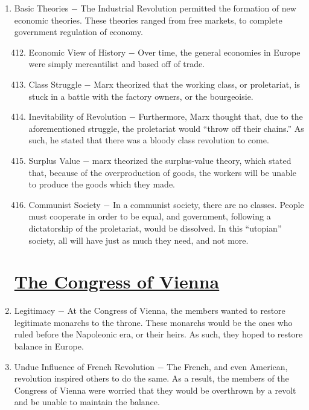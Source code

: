 \documentclass[12pt]{article}
\begin{document}
\begin{enumerate}
\item Basic Theories $-$ The Industrial Revolution permitted the formation of new economic theories. These theories ranged from free markets, to complete government regulation of economy.

\begin{enumerate}[label=\arabic{*}.]
\setcounter{enumii}{411}

\item Economic View of History $-$ Over time, the general economies in Europe were simply mercantilist and based off of trade. 

\item Class Struggle $-$ Marx theorized that the working class, or proletariat, is stuck in a battle with the factory owners, or the bourgeoisie. 

\item Inevitability of Revolution $-$ Furthermore, Marx thought that, due to the aforementioned struggle, the proletariat would ``throw off their chains.'' As such, he stated that there was a bloody class revolution to come.

\item Surplus Value $-$ marx theorized the surplus-value theory, which stated that, because of the overproduction of goods, the workers will be unable to produce the goods which they made.

\item Communist Society $-$ In a communist society, there are no classes. People must cooperate in order to be equal, and government, following a dictatorship of the proletariat, would be dissolved. In this ``utopian'' society, all will have just as much they need, and not more.

\end{enumerate}
\setcounter{enumi}{416}

\section{\underline{The Congress of Vienna}}

\item Legitimacy $-$ At the Congress of Vienna, the members wanted to restore legitimate monarchs to the throne. These monarchs would be the ones who ruled before the Napoleonic era, or their heirs. As such, they hoped to restore balance in Europe.

\item Undue Influence of French Revolution $-$ The French, and even American, revolution inspired others to do the same. As a result, the members of the Congress of Vienna were worried that they would be overthrown by a revolt and be unable to maintain the balance.


\end{enumerate}
\end{document}
